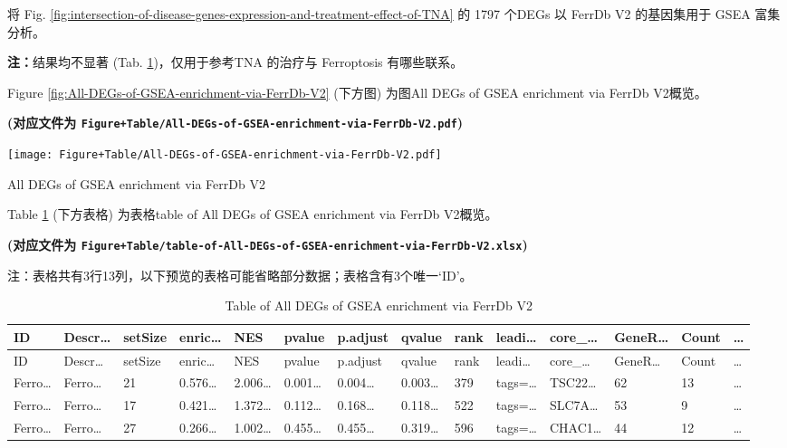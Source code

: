 \documentclass[
]{article}
\begin{document}
将 Fig. \ref{fig:intersection-of-disease-genes-expression-and-treatment-effect-of-TNA} 的 1797 个DEGs 以 FerrDb V2 的基因集用于 GSEA 富集分析。

\textbf{注：}结果均不显著 (Tab. \ref{tab:table-of-All-DEGs-of-GSEA-enrichment-via-FerrDb-V2})，仅用于参考TNA 的治疗与 Ferroptosis 有哪些联系。

Figure \ref{fig:All-DEGs-of-GSEA-enrichment-via-FerrDb-V2} (下方图) 为图All DEGs of GSEA enrichment via FerrDb V2概览。

\textbf{(对应文件为 \texttt{Figure+Table/All-DEGs-of-GSEA-enrichment-via-FerrDb-V2.pdf})}

\def\@captype{figure}
\begin{center}
\texttt{[image: Figure+Table/All-DEGs-of-GSEA-enrichment-via-FerrDb-V2.pdf]}
\caption{All DEGs of GSEA enrichment via FerrDb V2}\label{fig:All-DEGs-of-GSEA-enrichment-via-FerrDb-V2}
\end{center}

Table \ref{tab:table-of-All-DEGs-of-GSEA-enrichment-via-FerrDb-V2} (下方表格) 为表格table of All DEGs of GSEA enrichment via FerrDb V2概览。

\textbf{(对应文件为 \texttt{Figure+Table/table-of-All-DEGs-of-GSEA-enrichment-via-FerrDb-V2.xlsx})}

\begin{center}\begin{tcolorbox}[colback=gray!10, colframe=gray!50, width=0.9\linewidth, arc=1mm, boxrule=0.5pt]注：表格共有3行13列，以下预览的表格可能省略部分数据；表格含有3个唯一`ID'。
\end{tcolorbox}
\end{center}

\begin{longtable}[]{@{}llllllllllllll@{}}
\caption{\label{tab:table-of-All-DEGs-of-GSEA-enrichment-via-FerrDb-V2}Table of All DEGs of GSEA enrichment via FerrDb V2}\tabularnewline
\toprule
ID & Descr\ldots{} & setSize & enric\ldots{} & NES & pvalue & p.adjust & qvalue & rank & leadi\ldots{} & core\_\ldots{} & GeneR\ldots{} & Count & \ldots{}\tabularnewline
\midrule
\endfirsthead
\toprule
ID & Descr\ldots{} & setSize & enric\ldots{} & NES & pvalue & p.adjust & qvalue & rank & leadi\ldots{} & core\_\ldots{} & GeneR\ldots{} & Count & \ldots{}\tabularnewline
\midrule
\endhead
Ferro\ldots{} & Ferro\ldots{} & 21 & 0.576\ldots{} & 2.006\ldots{} & 0.001\ldots{} & 0.004\ldots{} & 0.003\ldots{} & 379 & tags=\ldots{} & TSC22\ldots{} & 62 & 13 & \ldots{}\tabularnewline
Ferro\ldots{} & Ferro\ldots{} & 17 & 0.421\ldots{} & 1.372\ldots{} & 0.112\ldots{} & 0.168\ldots{} & 0.118\ldots{} & 522 & tags=\ldots{} & SLC7A\ldots{} & 53 & 9 & \ldots{}\tabularnewline
Ferro\ldots{} & Ferro\ldots{} & 27 & 0.266\ldots{} & 1.002\ldots{} & 0.455\ldots{} & 0.455\ldots{} & 0.319\ldots{} & 596 & tags=\ldots{} & CHAC1\ldots{} & 44 & 12 & \ldots{}\tabularnewline
\bottomrule
\end{longtable}
\end{document}
